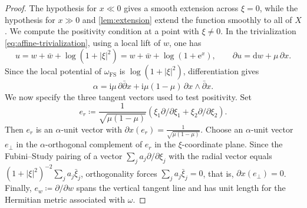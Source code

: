 \documentclass[11pt,a4paper]{article}
\begin{document}
	\begin{proof}
		The hypothesis for $x\ll0$ gives a smooth extension across $\xi=0$,
		while the hypothesis for $x\gg 0$ and \cref{lem:extension} extend the
		function smoothly to all of $X$.
		We compute the positivity condition at a point with $\xi\ne0$.  In the
		trivialization \eqref{eq:affine-trivialization}, using a local lift of $w$,
		one has
		\[
		u=w+\bar w+\log(1+|\xi|^2)
		=w+\bar w+\log(1+\mathrm{e}^x),
		\qquad
		\partial u=\mathrm{d}w+\mu\,\partial x.
		\]
		Since the local potential of $\omega_{\mathrm{FS}}$ is
		$\log(1+|\xi|^2)$, differentiation gives
		\begin{equation}
			\alpha
			=\mathrm{i}\mu\,\partial\bar\partial x
			+\mathrm{i}\mu(1-\mu)\,\partial x\wedge\bar\partial x.
			\label{eq:alpha-x}
		\end{equation}
		We now specify the three tangent vectors used to test positivity.  Set
		\[
		e_r\coloneqq \frac{1}{\sqrt{\mu(1-\mu)}}(\xi_1\partial/\partial\xi_1+\xi_2\partial/\partial\xi_2).
		\]
		Then $e_r$ is an $\alpha$-unit vector with
		$
		\partial x(e_r)=\frac{1}{\sqrt{\mu(1-\mu)}}.
		$
		Choose an $\alpha$-unit vector $e_\perp$ in the $\alpha$-orthogonal
		complement of $e_r$ in the $\xi$-coordinate plane.  Since the
		Fubini--Study pairing of a vector $\sum_j a_j\partial/\partial\xi_j$
		with the radial vector equals $(1+|\xi|^2)^{-2}\sum_j a_j\bar\xi_j$,
		orthogonality forces $\sum_j a_j\bar\xi_j=0$, that is,
		$\partial x(e_\perp)=0$.  Finally,
		$e_w\coloneqq\partial/\partial w$ spans the vertical tangent line and
		has unit length for the Hermitian metric associated with $\omega$.
		

\end{proof}
\end{document}
